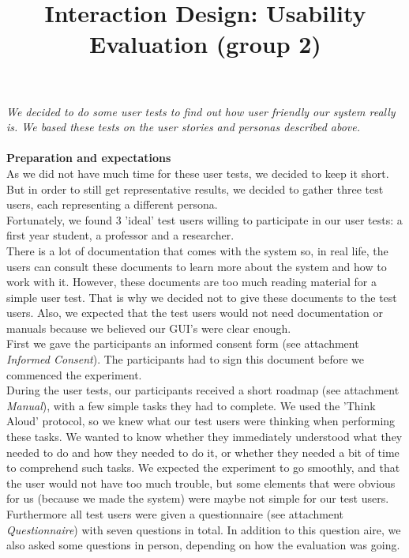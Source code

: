 \documentclass[a4paper]{article}
\title{Interaction Design: Usability Evaluation (group 2)}
\author{}
\date{}
\begin{document}
\maketitle

\textit{We decided to do some user tests to find out how user friendly our system really is. We based these tests on the user stories and personas described above.} \\
\\
\textbf{Preparation and expectations }\\
As we did not have much time for these user tests, we decided to
keep it short. But in order to still get representative results, we decided
to gather three test users, each representing a different persona.\\ 
Fortunately, we found 3 'ideal' test users willing to participate in
our user tests: a first year student, a professor and a researcher.\\ 
There is a lot of documentation that comes with the system so, in
real life, the users can consult these documents to learn more about
the system and how to work with it. However, these documents are too
much reading material for a simple user test. That is why we decided
not to give these documents to the test users. Also, we expected that
the test users would not need documentation or manuals because we believed
our GUI's were clear enough. \\
First we gave the participants an informed consent form (see
attachment \textit{Informed Consent}). The participants had to sign this
document before we commenced the experiment.\\
During the user tests, our participants received a short roadmap
(see attachment \textit{Manual}), with a few simple tasks they had to
complete. We used the 'Think Aloud' protocol, so we knew what our test users were thinking when performing these tasks. We wanted to know whether they immediately understood what they needed to do and how they needed to do it, or whether they needed a bit of time to comprehend such tasks. We expected the experiment to go smoothly, and that the user would not have too much trouble, but some elements that were obvious for us (because we made the system) were maybe not simple for our test users. \\
Furthermore all test users were given a questionnaire (see attachment
\textit{Questionnaire}) with seven questions in total. In addition to this question
aire, we also asked some questions in person, depending on
how the evaluation was going.\\
\end{document}
